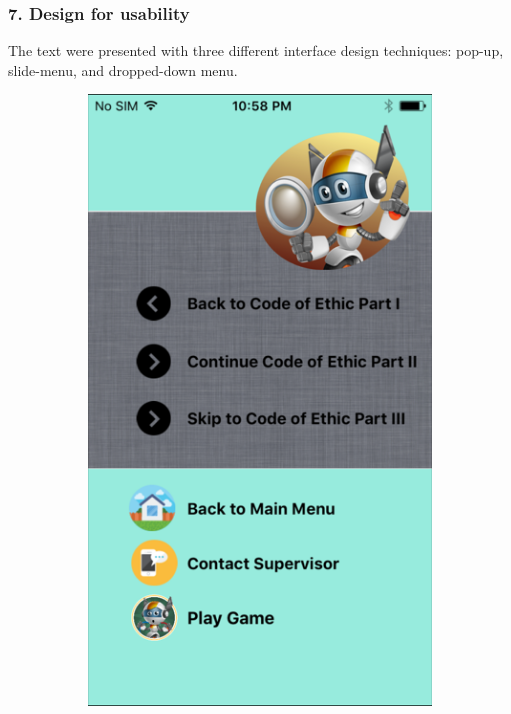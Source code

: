 \newpage 
\subsubsection{7. Design for usability}
The text were presented with three different interface design techniques: pop-up, slide-menu, and dropped-down menu. 

\begin{figure}[!hbt]\centering
    \begin{subfigure}{0.3\textwidth}
\includegraphics[width=\textwidth]{reverse}

\end{subfigure}
\end{figure}
